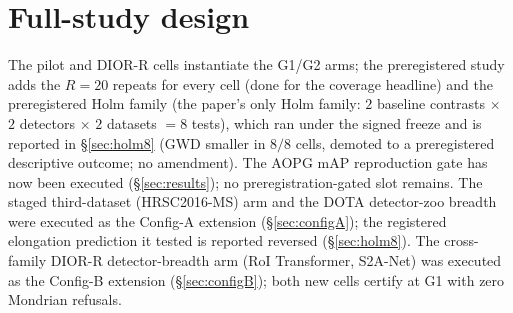 \documentclass[journal]{IEEEtran}
\begin{document}
\section{Full-study design}\label{sec:fullstudy}
The pilot and DIOR-R cells instantiate the G1/G2 arms; the preregistered study adds the $R{=}20$ repeats for
every cell (done for the coverage headline) and the preregistered
Holm family (the paper's only Holm family: $2$ baseline contrasts $\times$ $2$ detectors $\times$ $2$ datasets
$=8$ tests), which ran under the signed freeze and is reported in \S\ref{sec:holm8} (GWD smaller in $8/8$
cells, demoted to a preregistered descriptive outcome; no amendment). The AOPG mAP reproduction gate has now
been executed (\S\ref{sec:results}); no preregistration-gated slot remains. The staged third-dataset
(HRSC2016-MS) arm and the DOTA detector-zoo breadth were executed as the Config-A extension
(\S\ref{sec:configA}); the registered elongation prediction it tested is reported reversed (\S\ref{sec:holm8}).
The cross-family DIOR-R detector-breadth arm (RoI Transformer, S2A-Net) was executed as the Config-B
extension (\S\ref{sec:configB}); both new cells certify at G1 with zero Mondrian refusals.
\end{document}
